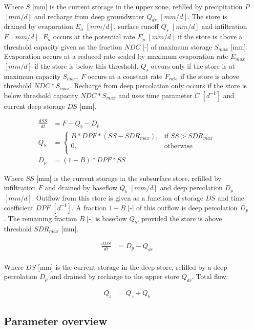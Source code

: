 Where $S$ [mm] is the current storage in the upper zone, refilled by precipitation $P$ $[mm/d]$ and recharge from deep groundwater $Q_{dr}$ $[mm/d]$. 
The store is drained by evaporation $E_a$ $[mm/d]$, surface runoff $Q_{s}$ $[mm/d]$ and infiltration $F$ $[mm/d]$.
$E_a$ occurs at the potential rate $E_p$ $[mm/d]$ if the store is above a threshold capacity given as the fraction $NDC$ [-] of maximum storage $S_{max}$ [mm].
Evaporation occurs at a reduced rate scaled by maximum evaporation rate $E_{max}$ $[mm/d]$ if the store is below this threshold.
$Q_s$ occurs only if the store is at maximum capacity $S_{max}$. 
$F$ occurs at a constant rate $F_{rate}$ if the store is above threshold $NDC*S_{max}$.
Recharge from deep percolation only occurs if the store is below threshold capacity $NDC*S_{max}$ and uses time parameter $C$ $[d^{-1}]$ and current deep storage $DS$ [mm].

\begin{align}
	\frac{dSS}{dt} &=F - Q_b-D_p\\
	Q_b &= \begin{cases}
		B*DPF*(SS-SDR_{max}), &\text{if } SS > SDR_{max} \\
		0, & \text{otherwise} \\
	\end{cases} \\
	D_p &= (1-B)*DPF*SS
\end{align}

Where $SS$ [mm] is the current storage in the subsurface store, refilled by infiltration $F$ and drained by baseflow $Q_b$ $[mm/d]$ and deep percolation $D_p$ $[mm/d]$.
Outflow from this store is given as a function of storage $DS$ and time coefficient  $DPF$ $[d^{-1}]$.
A fraction $1-B$ [-] of this outflow is deep percolation $D_p$.
The remaining fraction $B$ [-] is baseflow $Q_b$, provided the store is above threshold $SDR_{max}$ [mm].

\begin{align}
	\frac{dDS}{dt} &= D_p - Q_{dr}  \\
\end{align}
  
Where $DS$ [mm] is the current storage in the deep store, refilled by a deep percolation $D_p$ and drained by recharge to the upper store $Q_{dr}$.
Total flow:

\begin{align}
	Q_t &= Q_s+Q_b
\end{align}

\subsection{Parameter overview}

